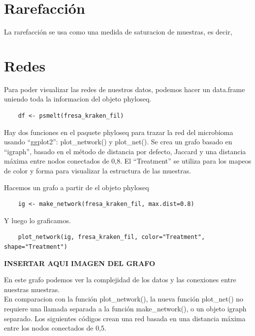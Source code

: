 \section{Rarefacción}
La rarefacción se usa como una medida de saturacion de muestras, es decir, 




\section{Redes}





Para poder visualizar las redes de nuestros datos, podemos hacer un data.frame uniendo toda la informacion
del objeto phyloseq.\\

\begin{lstlisting}
    df <- psmelt(fresa_kraken_fil)
\end{lstlisting}

Hay dos funciones en el paquete phyloseq para trazar la red del microbioma usando “ggplot2”: plot\_network() y plot\_net().
Se crea un grafo basado en “igraph”, basado en el método de distancia por defecto, Jaccard y una distancia
máxima entre nodos conectados de 0,8. El “Treatment” se utiliza para los mapeos de color y forma para
visualizar la estructura de las muestras.

Hacemos un grafo a partir de el objeto phyloseq

\begin{lstlisting}
    ig <- make_network(fresa_kraken_fil, max.dist=0.8)
\end{lstlisting}

Y luego lo graficamos.

\begin{lstlisting}
    plot_network(ig, fresa_kraken_fil, color="Treatment", shape="Treatment")
\end{lstlisting}

\textbf{INSERTAR AQUI IMAGEN DEL GRAFO}

En este grafo podemos ver la complejidad de los datos y las conexiones entre nuestras muestras.\\

En comparacion con la función plot\_network(), la nueva función plot\_net() no requiere una llamada separada a la función make\_network(), o un objeto igraph separado. Los siguientes códigos crean una red basada en una distancia máxima entre los nodos conectados de 0,5.

